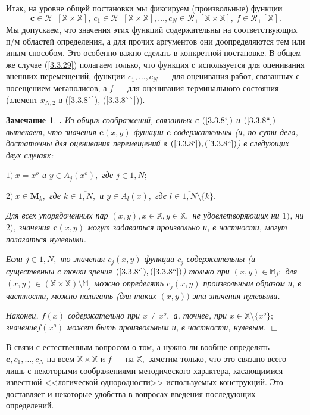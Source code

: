 \documentclass[11pt,twoside,openany]{report}
\newcommand{\bfn}{\begin{equation}}
\newcommand{\efn}{\end{equation}}
\newcommand{\ov}{\overline}
\newcounter{theo}
\newcounter{zam}
\newtheorem{zam}{Замечание}[section]
\newcommand{\TL}{\mbox{\bf{$\!\!$.}}}
\newcommand{\sm}{\setminus}
\newcommand{\bbm}{{\mathbb M}}
\newcommand{\bbx}{{\mathbb X}}
\begin{document}
Итак, на уровне общей постановки мы фиксируем (произвольные) функции
\bfn\label{3.3.29}\mathbf{c}\in \mathcal{R}_+[\bbx\times \bbx],\ c_1\in
\mathcal{R}_+[\bbx\times \bbx],\ldots,c_N\in \mathcal{R}_+[\bbx\times
\bbx],\ f\in \mathcal{R}_+[\bbx].
\efn
Мы допускаем, что значения этих функций содержательны на соответствующих п/м
областей определения, а для прочих аргументов они доопределяются тем или иным
способом. Это особенно важно сделать в конкретной постановке. В общем же случае
(\ref{3.3.29})  полагаем только, что функция $\mathbf{c}$ используется для оценивания
внешних перемещений, функции $c_1,\ldots,c_N$ --- для оценивания работ, связанных с
посещением мегаполисов, а $f$ --- для оценивания терминального состояния (элемент
$x_{N,2}$  в (\ref{3.3.8`}), (\ref{3.3.8``})).

\begin{zam}\label{z3.3.3}{\TL} Из общих соображений, связанных с $(\ref{3.3.8`})$ и
$(\ref{3.3.8``})$ вытекает, что значения $\mathbf{c}(x,y)$ функции $\mathbf{c}$
содержательны (и, по сути дела, достаточны для оценивания перемещений в
$(\ref{3.3.8`}), (\ref{3.3.8``})$) в следующих двух случаях:

$1)\ x = x^o$ и $y\in A_j(x^o),$ где $j\in \ov{1,N};$

$2)\ x\in \mathbf{M}_k,$ где $k\in \ov{1,N},$ и $y\in A_l(x),$ где
$l\in \ov{1,N}\sm\{k\}.$

Для всех упорядоченных пар $(x,y), x\in \bbx, y\in \bbx,$ не удовлетворяющих
ни $1)$, ни $2)$, значения $\mathbf{c}(x,y)$ могут задаваться произвольно и,
в частности, могут полагаться нулевыми.

Если $j\in\ov{1,N},$ то значения $c_j(x,y)$  функции $c_j$ содержательны (и
существенны с точки зрения $(\ref{3.3.8`}), (\ref{3.3.8``})$) только при $(x,y)
\in \bbm_j;$ для $(x,y)\in (\bbx\times \bbx)\sm \bbm_j$ можно определять
$c_j(x,y)$ произвольным образом и, в частности, можно полагать (для таких
$(x,y))$ эти значения нулевыми.

Наконец, $f(x)$ содержательно при $x\neq x^o,$ а, точнее, при $x\in \bbx\sm
\{x^o\};$ значение$f(x^o)$  может быть произвольным и, в частности, нулевым.
\hfill $\Box$
\end{zam}
В связи с естественным вопросом о том, а нужно ли вообще определять
$\mathbf{c},c_1,\ldots,c_N$ на всем $\bbx \times \bbx$ и $f$ --- на $\bbx,$
заметим только, что это связано всего лишь с некоторыми соображениями методического
характера, касающимися известной <<логической однородности>> используемых конструкций.
Это доставляет и некоторые удобства в вопросах введения последующих определений.
\end{document}
